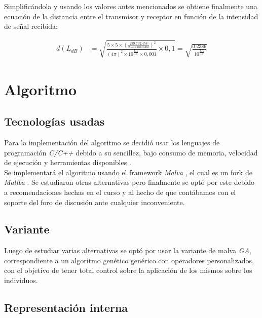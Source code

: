 \documentclass[journal]{IEEEtran}
\begin{document}
Simplificándola y usando los valores antes mencionados se obtiene finalmente una ecuación de la distancia entre el transmisor y receptor en función de la intensidad de señal recibida:

\begin{equation*}
\begin{split}
d(L_{dB}) &= \sqrt {\frac {5 \times 5 \times (\frac {299.792.458} {2.442.000.000})^2} {(4 \pi)^2 \times 10^{\frac {L_{dB}} {10}} \times 0,001} \times 0,1} = \sqrt {\frac {0.2386} {10^{\frac {L_{dB}} {10}}}}
\end{split}
\end{equation*}

\section{Algoritmo}

\subsection{Tecnologías usadas}

Para la implementación del algoritmo se decidió usar los lenguajes de programación \emph{C/C++} \cite{c} \cite{c++} debido a su sencillez, bajo consumo de memoria, velocidad de ejecución y herramientas disponibles \cite{why:c:c++}.\\

Se implementará el algoritmo usando el framework \emph{Malva} \cite{malva}, el cual es un fork de \emph{Mallba} \cite{mallba}. Se estudiaron otras alternativas pero finalmente se optó por este debido a recomendaciones hechas en el curso y al hecho de que contábamos con el soporte del foro de discusión ante cualquier inconveniente.\\

\subsection{Variante}

Luego de estudiar varias alternativas se optó por usar la variante de malva \emph{GA}, correspondiente a un algoritmo genético genérico con operadores personalizados, con el objetivo de tener total control sobre la aplicación de los mismos sobre los individuos.\\


\subsection{Representación interna}
\end{document}
